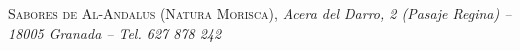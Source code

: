 \documentclass[12pt]{article}
\newenvironment{parrafo}{\begin{trivlist}\item []}{\end{trivlist}}
\begin{document}


 \scriptsize
 \begin{parrafo}
 \centerline{\textsc{Sabores de Al-Andalus (Natura Morisca)},
 \textit{Acera del Darro, 2 (Pasaje Regina) -- 18005
 Granada -- Tel. 627 878 242}}
 \end{parrafo}

\end{document}
